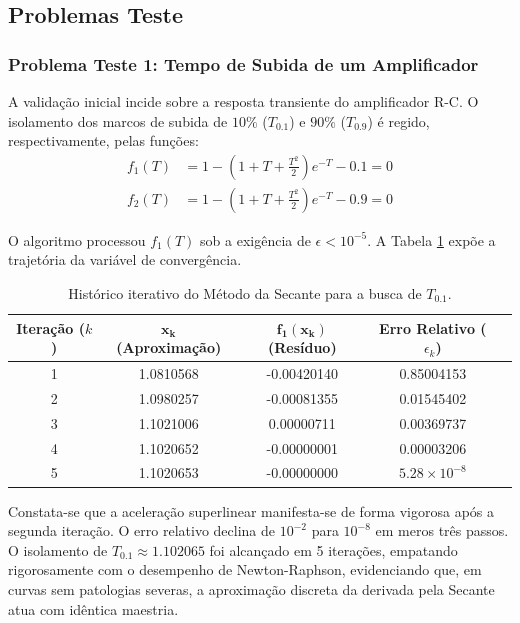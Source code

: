 \subsection{Problemas Teste}
\label{subsec:problemas_testes_secante}

\subsubsection{Problema Teste 1: Tempo de Subida de um Amplificador}
\label{subsubsec:problema_teste_1_secante}

A validação inicial incide sobre a resposta transiente do amplificador R-C. O isolamento dos marcos de subida de $10\%$ ($T_{0.1}$) e $90\%$ ($T_{0.9}$) é regido, respectivamente, pelas funções:
\begin{align}
    f_1(T) &= 1 - \left(1 + T + \frac{T^2}{2}\right)e^{-T} - 0.1 = 0 \label{eq:f1_secante} \\
    f_2(T) &= 1 - \left(1 + T + \frac{T^2}{2}\right)e^{-T} - 0.9 = 0 \label{eq:f2_secante}
\end{align}

O algoritmo processou $f_1(T)$ sob a exigência de $\epsilon < 10^{-5}$. A Tabela \ref{tab:secante_f1} expõe a trajetória da variável de convergência.

\begin{table}[htpb]
\centering
\caption{Histórico iterativo do Método da Secante para a busca de $T_{0.1}$.}
\label{tab:secante_f1}
\small
\begin{tabular}{@{}ccccc@{}}
\toprule
\textbf{Iteração ($k$)} & $\mathbf{x_k}$ (Aproximação) & $\mathbf{f_1(x_k)}$ (Resíduo) & \textbf{Erro Relativo} ($\epsilon_k$) \\ \midrule
1 & 1.0810568 & -0.00420140 & 0.85004153 \\
2 & 1.0980257 & -0.00081355 & 0.01545402 \\
3 & 1.1021006 & \phantom{-}0.00000711 & 0.00369737 \\
4 & 1.1020652 & -0.00000001 & 0.00003206 \\
5 & 1.1020653 & -0.00000000 & $5.28 \times 10^{-8}$ \\ \bottomrule
\end{tabular}
\end{table}

Constata-se que a aceleração superlinear manifesta-se de forma vigorosa após a segunda iteração. O erro relativo declina de $10^{-2}$ para $10^{-8}$ em meros três passos. O isolamento de $T_{0.1} \approx 1.102065$ foi alcançado em 5 iterações, empatando rigorosamente com o desempenho de Newton-Raphson, evidenciando que, em curvas sem patologias severas, a aproximação discreta da derivada pela Secante atua com idêntica maestria.

